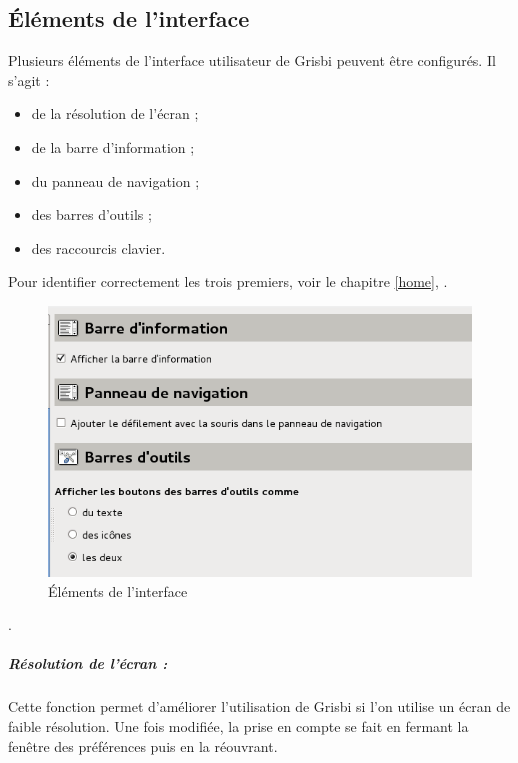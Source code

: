 \subsection{Éléments de l'interface\label{setup-display-toolbars}}

Plusieurs éléments de l'interface utilisateur de Grisbi peuvent être configurés. Il s'agit :

\begin{itemize}
	\item de la résolution de l'écran ;
	\item de la barre d'information ;
	\item du panneau de navigation ;
	\item des barres d'outils ;
	\item des raccourcis clavier.
\end{itemize}

Pour identifier correctement les trois premiers, voir le chapitre \vref{home},  \ifIllustration {}.
\begin{figure}[htbp]
\begin{center}
\includegraphics[scale=0.5]{image/screenshot/setup_toolbar}
\end{center}
\caption{Éléments de l'interface}
\label{setup-toolbar-img}
\end{figure}
\else .
\fi

\subparagraph{Résolution de l'écran :}

Cette fonction permet d'améliorer l'utilisation de Grisbi si l'on utilise un écran de faible résolution. Une fois modifiée, la prise en compte se fait en fermant la fenêtre des préférences puis en la réouvrant.




